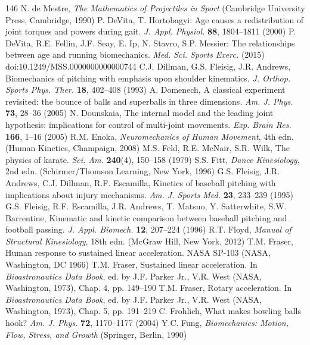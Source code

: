 \documentclass[12pt]{book}
\begin{document}
\begin{thebibliography}{146}
 N. de Mestre, \textit{The Mathematics of Projectiles in Sport} (Cambridge University Press, Cambridge, 1990)
 P. DeVita, T. Hortobagyi: Age causes a redistribution of joint torques and powers during gait. \textit{J. Appl. Physiol.} \textbf{88}, 1804--1811 (2000)
 P. DeVita, R.E. Fellin, J.F. Seay, E. Ip, N. Stavro, S.P. Messier: The relationships between age and running biomechanics. \textit{Med. Sci. Sports Exerc.} (2015) doi:10.1249/MSS.0000000000000744
 C.J. Dillman, G.S. Fleisig, J.R. Andrews, Biomechanics of pitching with emphasis upon shoulder kinematics. \textit{J. Orthop. Sports Phys. Ther.} \textbf{18}, 402--408 (1993)
 A. Domenech, A classical experiment revisited: the bounce of balls and superballs in three dimensions. \textit{Am. J. Phys.} \textbf{73}, 28--36 (2005)
 N. Dounskaia, The internal model and the leading joint hypothesis: implications for control of multi-joint movements. \textit{Exp. Brain Res.} \textbf{166}, 1--16 (2005)
 R.M. Enoka, \textit{Neuromechanics of Human Movement}, 4th edn. (Human Kinetics, Champaign, 2008)
 M.S. Feld, R.E. McNair, S.R. Wilk, The physics of karate. \textit{Sci. Am.} \textbf{240}(4), 150--158 (1979)
 S.S. Fitt, \textit{Dance Kinesiology}, 2nd edn. (Schirmer/Thomson Learning, New York, 1996)
 G.S. Fleisig, J.R. Andrews, C.J. Dillman, R.F. Escamilla, Kinetics of baseball pitching with implications about injury mechanisms. \textit{Am. J. Sports Med.} \textbf{23}, 233--239 (1995)
 G.S. Fleisig, R.F. Escamilla, J.R. Andrews, T. Matsuo, Y. Satterwhite, S.W. Barrentine, Kinematic and kinetic comparison between baseball pitching and football passing. \textit{J. Appl. Biomech.} \textbf{12}, 207--224 (1996)
 R.T. Floyd, \textit{Manual of Structural Kinesiology}, 18th edn. (McGraw Hill, New York, 2012)
 T.M. Fraser, Human response to sustained linear acceleration. NASA SP-103 (NASA, Washington, DC 1966)
 T.M. Fraser, Sustained linear acceleration. In \textit{Bioastronautics Data Book}, ed. by J.F. Parker Jr., V.R. West (NASA, Washington, 1973), Chap. 4, pp. 149--190
 T.M. Fraser, Rotary acceleration. In \textit{Bioastronautics Data Book}, ed. by J.F. Parker Jr., V.R. West (NASA, Washington, 1973), Chap. 5, pp. 191--219
 C. Frohlich, What makes bowling balls hook? \textit{Am. J. Phys.} \textbf{72}, 1170--1177 (2004)
 Y.C. Fung, \textit{Biomechanics: Motion, Flow, Stress, and Growth} (Springer, Berlin, 1990)

\end{thebibliography}
\end{document}

